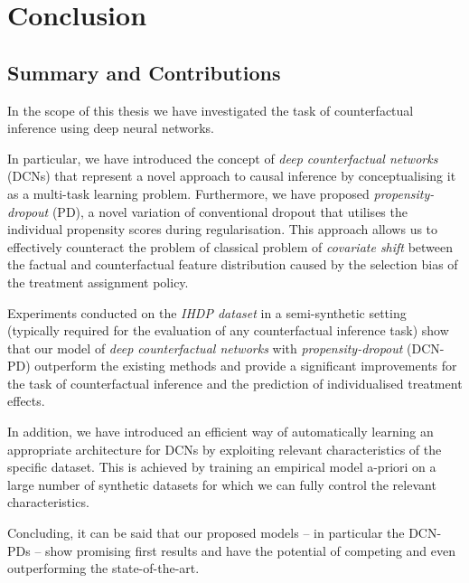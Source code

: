 %

\chapter{\label{ch:6-conclusion}Conclusion} 

\section{Summary and Contributions}
In the scope of this thesis we have investigated the task of counterfactual inference using deep neural networks. 

In particular, we have introduced the concept of \emph{deep counterfactual networks} (DCNs) that represent a novel approach to causal inference by conceptualising it as a multi-task learning problem. Furthermore, we have proposed \emph{propensity-dropout} (PD), a novel variation of conventional dropout that utilises the individual propensity scores during regularisation. This approach allows us to effectively counteract the problem of classical problem of \emph{covariate shift} between the factual and counterfactual feature distribution caused by the selection bias of the treatment assignment policy. 

Experiments conducted on the \emph{IHDP dataset} in a semi-synthetic setting (typically required for the evaluation of any counterfactual inference task) show that our model of \emph{deep counterfactual networks} with \emph{propensity-dropout} (DCN-PD) outperform the existing methods and provide a significant improvements for the task of counterfactual inference and the prediction of individualised treatment effects. 


In addition, we have introduced an efficient way of automatically learning an appropriate architecture for DCNs by exploiting relevant characteristics of the specific dataset. This is achieved by training an empirical model a-priori on a large number of synthetic datasets for which we can fully control the relevant characteristics.

Concluding, it can be said that our proposed models -- in particular the DCN-PDs -- show promising first results and have the potential of competing and even outperforming the state-of-the-art. %

